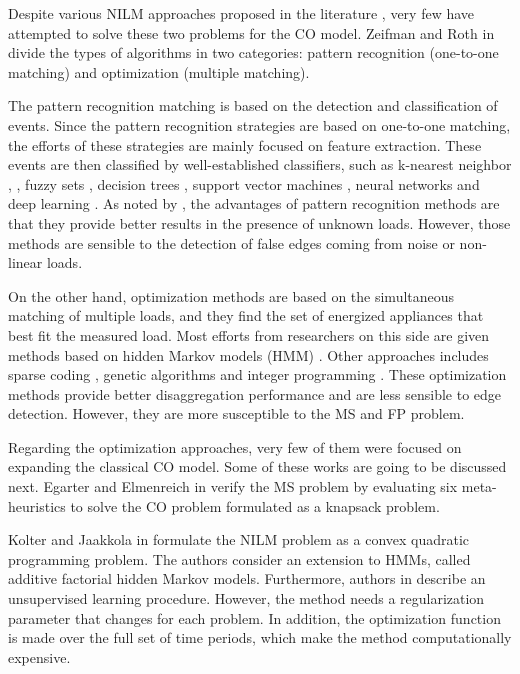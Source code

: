 Despite various NILM approaches proposed in the literature \cite{mostafa}, very few have attempted to solve these two problems for the CO model. Zeifman and Roth in \cite{zeifman} divide the types of algorithms in two categories: pattern recognition (one-to-one matching) and optimization (multiple matching).

The pattern recognition matching is based on the detection and classification of events. Since the pattern recognition strategies are based on one-to-one matching, the efforts of these strategies are mainly focused on feature extraction. These events are then classified by well-established classifiers, such as k-nearest neighbor \cite{Figueiredo2011}, \cite{berges2009, Froehlich2010}, fuzzy sets \cite{lin2011, ducange2014}, decision trees \cite{Nguyen2015, gillis2016}, support vector machines \cite{duarte2012, zoha2012}, neural networks \cite{zhou2016, bian2016} and deep learning \cite{mauch2016, jack2015}. As noted by \cite{zeifman}, the advantages of pattern recognition methods are that they provide better results in the presence of unknown loads. However, those methods are sensible to the detection of false edges coming from noise or non-linear loads.

On the other hand, optimization methods are based on the simultaneous matching of multiple loads, and they find the set of energized appliances that best fit the measured load. Most efforts from researchers on this side are given methods based on hidden Markov models (HMM) \cite{afhmm, reed, hmm_unsup, stephen_hmm}. Other approaches includes sparse coding \cite{sparse_kolter, nmf}, genetic algorithms \cite{meta} and integer programming \cite{suzuki, bhotto2016}. These optimization methods provide better disaggregation performance \cite{zeifman} and are less sensible to edge detection. However, they are more susceptible to the MS and FP problem.

Regarding the optimization approaches, very few of them were focused on expanding the classical CO model. Some of these works are going to be discussed next. Egarter and Elmenreich in \cite{meta} verify the MS problem by evaluating six meta-heuristics to solve the CO problem formulated as a knapsack problem. 

Kolter and Jaakkola in \cite{afhmm} formulate the NILM problem as a convex quadratic programming problem. The authors consider an extension to HMMs, called additive factorial hidden Markov models. Furthermore, authors in \cite{afhmm} describe an unsupervised learning procedure. However, the method needs a regularization parameter that changes for each problem. In addition, the optimization function is made over the full set of time periods, which make the method computationally expensive.


